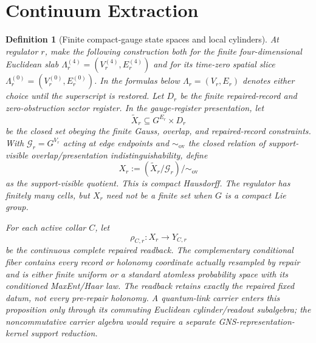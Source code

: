 \documentclass[11pt]{article}
\numberwithin{equation}{section}
\newtheorem{definition}[theorem]{Definition}
\theoremstyle{remark}
\begin{document}
\section{Continuum Extraction}
\label{sec:continuum-extraction}

\begin{definition}[Finite compact-gauge state spaces and local cylinders]
\label{def:finite-cylinders}
At regulator \(r\), make the following construction both for the finite four-dimensional
Euclidean slab \(\Lambda_r^{(4)}=(V_r^{(4)},E_r^{(4)})\) and for its time-zero spatial slice
\(\Lambda_r^{(0)}=(V_r^{(0)},E_r^{(0)})\). In the formulas below
\(\Lambda_r=(V_r,E_r)\) denotes either choice until the superscript is restored. Let \(D_r\) be
the finite repaired-record and zero-obstruction sector register. In the gauge-register
presentation, let
\[
\widetilde X_r\subseteq G^{E_r}\times D_r
\]
be the closed set obeying the finite Gauss, overlap, and repaired-record constraints. With
\(\mathcal G_r=G^{V_r}\) acting at edge endpoints and
\(\sim_{\mathrm{ov}}\) the closed relation of support-visible overlap/presentation
indistinguishability, define
\[
X_r:=(\widetilde X_r/\mathcal G_r)/{\sim_{\mathrm{ov}}}
\]
as the support-visible quotient. This is compact Hausdorff. The regulator
has finitely many cells, but \(X_r\) need not be a finite set when \(G\) is a compact Lie group.

For each active collar \(C\), let
\[
\rho_{C,r}:X_r\to Y_{C,r}
\]
be the continuous complete repaired readback. The complementary conditional fiber contains every
record or holonomy coordinate actually resampled by repair and is either finite uniform or a
standard atomless probability space with its conditioned MaxEnt/Haar law. The readback retains
exactly the repaired fixed datum, not every pre-repair holonomy. A quantum-link carrier enters this
proposition only through its commuting Euclidean cylinder/readout subalgebra; the noncommutative
carrier algebra would require a separate GNS-representation-kernel support reduction.


\end{definition}
\end{document}
